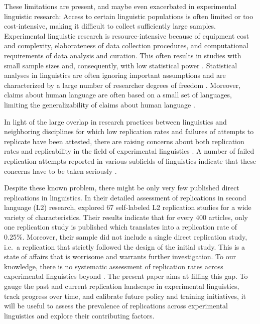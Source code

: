 \documentclass[cm,linguex]{glossa}
\begin{document}
These limitations are present, and maybe even exacerbated in experimental linguistic research: Access to certain linguistic populations is often limited or too cost-intensive, making it difficult to collect sufficiently large samples. Experimental linguistic research is resource-intensive because of equipment cost and complexity, elaborateness of data collection procedures, and computational requirements of data analysis and curation. This often results in studies with small sample sizes and, consequently, with low statistical power \citep[e.g.,][]{casillas2021interlingual, kirby2018mixed}. Statistical analyses in linguistics are often ignoring important assumptions \citep[e.g.,][]{winter2021independence} and are characterized by a large number of researcher degrees of freedom \citep{roettger2019researcher}. Moreover, claims about human language are often based on a small set of languages, limiting the generalizability of claims about human language \citep[e.g.,][]{levisen2019biases, majid2010language}.

In light of the large overlap in research practices between linguistics and neighboring disciplines for which low replication rates and failures of attempts to replicate have been attested, there are raising concerns about both replication rates and replicability in the field of experimental linguistics \citep[e.g.,][]{marsden_replication_2018, roettger_toward_2019, sonning2021replication}. A number of failed replication attempts reported in various subfields of linguistics indicate that these concerns have to be taken seriously \citep[e.g.,][]{chen_chinese_2007, morey2021pre, nieuwland_large-scale_2018, papesh_just_2015, stack_failure_2018, westbury_implicit_2018}.

Despite these known problem, there might be only very few published direct replications in linguistics. In their detailed assessment of replications in second language (L2) research, \citet{marsden_replication_2018} explored 67 self-labeled L2 replication studies for a wide variety of characteristics. Their results indicate that for every 400 articles, only one replication study is published which translates into a replication rate of 0.25\%. Moreover, their sample did not include a single direct replication study, i.e.~a replication that strictly followed the design of the initial study. This is a state of affairs that is worrisome and warrants further investigation. To our knowledge, there is no systematic assessment of replication rates across experimental linguistics beyond \citet{marsden_replication_2018}. The present paper aims at filling this gap. To gauge the past and current replication landscape in experimental linguistics, track progress over time, and calibrate future policy and training initiatives, it will be useful to assess the prevalence of replications across experimental linguistics and explore their contributing factors.
\end{document}
